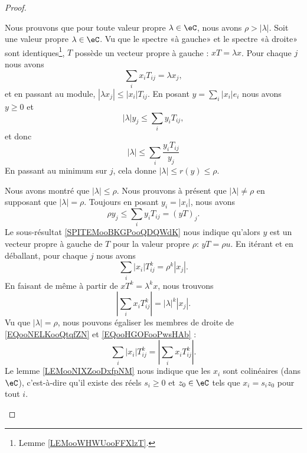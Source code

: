 \begin{proof}
\begin{subproof}
		Nous prouvons que pour toute valeur propre \( \lambda\in \eC\), nous avons \( \rho>| \lambda |\). Soit une valeur propre \( \lambda\in \eC\). Vu que le spectre «à gauche»  et le spectre «à droite» sont identiques\footnote{Lemme \ref{LEMooWHWUooFFXlzT}.}, \( T\) possède un vecteur propre à gauche : \( xT=\lambda x\). Pour chaque \( j\) nous avons
		\begin{equation}
			\sum_ix_iT_{ij}=\lambda x_j,
		\end{equation}
		et en passant au module, \( | \lambda x_j |\leq | x_i |T_{ij}\). En posant \( y=\sum_i| x_i |e_i\) nous avons \( y\geq 0\) et
		\begin{equation}
			| \lambda |y_j\leq \sum_iy_iT_{ij},
		\end{equation}
		et donc
		\begin{equation}
			| \lambda |\leq \sum_i\frac{ y_iT_{ij} }{ y_j }
		\end{equation}
		En passant au minimum sur \( j\), cela donne \( | \lambda |\leq r(y)\leq \rho\).

		Nous avons montré que \( | \lambda |\leq \rho\). Nous prouvons à présent que \( | \lambda |\neq \rho\) en supposant que \( | \lambda |=\rho\). Toujours en posant \( y_i=| x_i |\), nous avons
		\begin{equation}
			\rho y_j\leq \sum_iy_iT_{ij}=(yT)_j.
		\end{equation}
		Le sous-résultat \ref{SPITEMooBKGPooQDQWdK} nous indique qu'alors \( y\) est un vecteur propre à gauche de \( T\) pour la valeur propre \( \rho\): \( yT=\rho u\). En itérant et en déballant, pour chaque \( j\) nous avons
		\begin{equation}        \label{EQooNELKooQtqfZN}
			\sum_i| x_i |T_{ij}^k=\rho^k| x_j |.
		\end{equation}
		En faisant de même à partir de \( xT^k=\lambda^kx\), nous trouvons
		\begin{equation}        \label{EQooHGOFooPwsHAb}
			| \sum_ix_iT_{ij}^k |=| \lambda |^k| x_j |.
		\end{equation}
		Vu que \( | \lambda |=\rho\), nous pouvons égaliser les membres de droite de \eqref{EQooNELKooQtqfZN} et \eqref{EQooHGOFooPwsHAb} :
		\begin{equation}
			\sum_i| x_i |T_{ij}^k=| \sum_ix_iT_{ij}^k |.
		\end{equation}
		Le lemme \ref{LEMooNIXZooDxfpNM} nous indique que les \( x_i\) sont colinéaires (dans \( \eC\)), c'est-à-dire qu'il existe des réels \( s_i\geq 0\) et \( z_0\in \eC\) tels que \( x_i=s_iz_0\) pour tout \( i\).


\end{subproof}
\end{proof}
